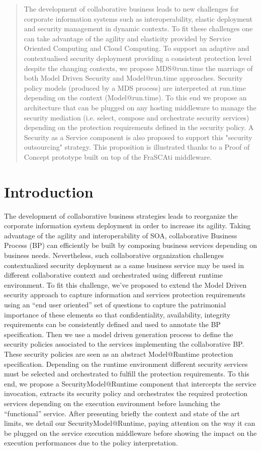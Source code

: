 \documentclass[runningheads,a4paper]{llncs}
\begin{document}
\begin{abstract}
The development of collaborative business leads to new challenges for corporate information systems such as interoperability, elastic deployment and security management in dynamic contexts. To fit these challenges one can take advantage of the agility and elasticity provided by Service Oriented Computing and Cloud Computing. To support an adaptive and contextualised security deployment providing a consistent protection level despite the changing contexts, we propose MDS@run.time the marriage of both Model Driven Security and Model@run.time approaches. Security policy models (produced by a MDS process) are interpreted at run.time depending on the context (Model@run.time). To this end we propose an architecture that can be plugged on any hosting middleware to manage the security mediation (i.e. select, compose and orchestrate security services) depending on the protection requirements defined in the security policy. A Security as a Service component is also proposed to support this "security outsourcing" strategy. This proposition is illustrated thanks to a Proof of Concept prototype built on top of the FraSCAti middleware.
\end{abstract}

\section{Introduction}
The development of collaborative business strategies leads to reorganize the corporate information system deployment in order to increase its agility. Taking advantage of the agility and interoperability of SOA, collaborative Business Process (BP) can efficiently be built by composing business services depending on business needs. Nevertheless, such collaborative organization challenges contextualized security deployment as a same business service may be used in different collaborative context and orchestrated using different runtime environment.
To fit this challenge, we've proposed to extend the Model Driven security approach to capture information and services protection requirements using an “end user oriented” set of questions to capture the patrimonial importance of these elements so that confidentiality, availability, integrity requirements can be consistently defined and used to annotate the BP specification. Then we use a model driven generation process to define the security policies associated to the services implementing the collaborative BP.
These security policies are seen as an abstract Model@Runtime protection specification. Depending on the runtime environment different security services must be selected and orchestrated to fulfill the protection requirements. To this end, we propose a SecurityModel@Runtime component that intercepts the service invocation, extracts its security policy and orchestrates the required protection services depending on the execution environment before launching the “functional” service. 
After presenting briefly the context and state of the art limits, we detail our SecurityModel@Runtime, paying attention on the way it can be plugged on the service execution middleware before showing the impact on the execution performances due to the policy interpretation.
\end{document}
